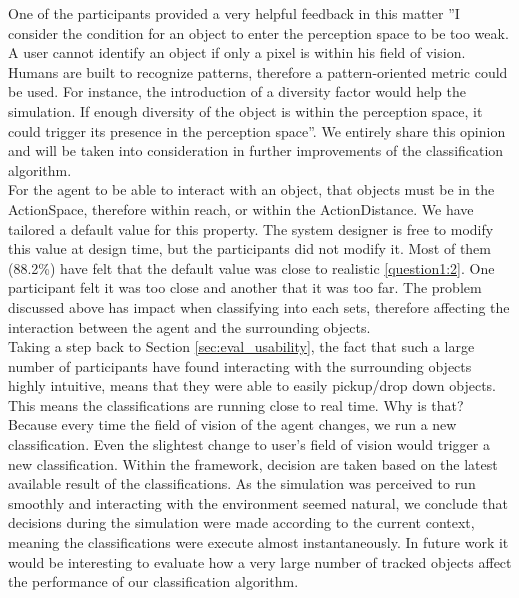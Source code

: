 One of the participants provided a very helpful feedback in this matter ''I consider the condition for an object to enter the perception space to be too weak. A user cannot identify an object if only a pixel is within his field of vision. Humans are built to recognize patterns, therefore a pattern-oriented metric could be used. For instance, the introduction of a diversity factor would help the simulation. If enough diversity of the object is within the perception space, it could trigger its presence in the perception space''. We entirely share this opinion and will be taken into consideration in further improvements of the classification algorithm.\\

For the agent to be able to interact with an object, that objects must be in the ActionSpace, therefore within reach, or within the ActionDistance. We have tailored a default value for this property. The system designer is free to modify this value at design time, but the participants did not modify it. Most of them (88.2\%) have felt that the default value was close to realistic \ref{question1:2}. One participant felt it was too close and another that it was too far. The problem discussed above has impact when classifying into each sets, therefore affecting the interaction between the agent and the surrounding objects.\\

Taking a step back to Section \ref{sec:eval_usability}, the fact that such a large number of participants have found interacting with the surrounding objects highly intuitive, means that they were able to easily pickup/drop down objects. This means the classifications are running close to real time. Why is that? Because every time the field of vision of the agent changes, we run a new classification. Even the slightest change to user's field of vision would trigger a new classification. Within the framework, decision are taken based on the latest available result of the classifications. As the simulation was perceived to run smoothly and interacting with the environment seemed natural, we conclude that decisions during the simulation were made according to the current context, meaning the classifications were execute almost instantaneously. In future work it would be interesting to evaluate how a very large number of tracked objects affect the performance of our classification algorithm.

